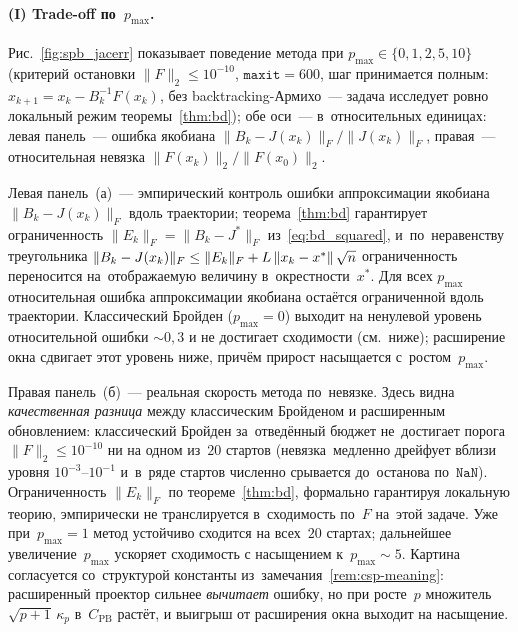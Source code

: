 \paragraph{(I) Trade-off по~$p_{\max}$.}
Рис.~\ref{fig:spb_jacerr} показывает поведение метода при
$p_{\max}\in\{0,1,2,5,10\}$ (критерий остановки $\|F\|_2\le 10^{-10}$,
$\mathtt{maxit}=600$, шаг принимается полным:
$x_{k+1}=x_k - B_k^{-1}F(x_k)$, без backtracking-Армихо~--- задача
исследует ровно локальный режим теоремы~\ref{thm:bd}); обе оси~---
в~относительных единицах: левая панель~--- ошибка якобиана
$\|B_k - J(x_k)\|_F/\|J(x_k)\|_F$, правая~--- относительная невязка
$\|F(x_k)\|_2/\|F(x_0)\|_2$.

Левая панель~(а)~--- эмпирический контроль ошибки аппроксимации
якобиана $\|B_k-J(x_k)\|_F$ вдоль траектории; теорема~\ref{thm:bd}
гарантирует ограниченность $\|E_k\|_F = \|B_k - J^*\|_F$
из~\eqref{eq:bd_squared}, и~по~неравенству треугольника
$\|B_k - J(x_k)\|_F \le \|E_k\|_F + L\left\|x_k-x^*\right\|\sqrt n$ ограниченность
переносится на~отображаемую величину в~окрестности~$x^*$. Для всех
$p_{\max}$ относительная ошибка
аппроксимации якобиана остаётся ограниченной вдоль траектории.
Классический Бройден ($p_{\max}=0$) выходит на ненулевой уровень
относительной ошибки $\sim 0{,}3$ и не достигает сходимости (см.\ ниже);
расширение окна сдвигает этот уровень ниже, причём прирост насыщается
с~ростом~$p_{\max}$.

Правая панель~(б)~--- реальная скорость метода по~невязке. Здесь видна
\emph{качественная разница} между классическим Бройденом и расширенным
обновлением: классический Бройден за~отведённый бюджет не~достигает
порога $\|F\|_2\le 10^{-10}$ ни на одном из~$20$ стартов
(невязка~медленно дрейфует вблизи уровня $10^{-3}$--$10^{-1}$
и~в~ряде стартов численно срывается до~останова по~$\mathtt{NaN}$).
Ограниченность $\|E_k\|_F$ по теореме~\ref{thm:bd}, формально
гарантируя локальную теорию, эмпирически не транслируется
в~сходимость по~$F$ на~этой задаче.
Уже при~$p_{\max}=1$ метод устойчиво сходится на всех~$20$ стартах;
дальнейшее увеличение~$p_{\max}$ ускоряет сходимость с насыщением
к~$p_{\max}\sim 5$. Картина согласуется со~структурой константы
из~замечания~\ref{rem:csp-meaning}: расширенный проектор сильнее
\emph{вычитает} ошибку, но при росте~$p$ множитель $\sqrt{p+1}\,\kappa_p$
в~$C_{\mathrm{PB}}$ растёт, и выигрыш от расширения окна выходит на насыщение.

